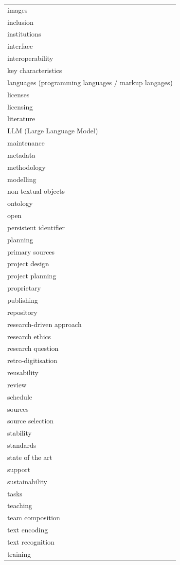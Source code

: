 \documentclass[
  letterpaper,
  DIV=11,
  numbers=noendperiod]{scrreprt}
\begin{document}
\begin{longtable}[]{@{}
  >{\raggedright\arraybackslash}p{}@{}}
images \\
inclusion \\
institutions \\
interface \\
interoperability \\
key characteristics \\
languages (programming languages / markup langages) \\
licenses \\
licensing \\
literature \\
LLM (Large Language Model) \\
maintenance \\
metadata \\
methodology \\
modelling \\
non textual objects \\
ontology \\
open \\
persistent identifier \\
planning \\
primary sources \\
project design \\
project planning \\
proprietary \\
publishing \\
repository \\
research-driven approach \\
research ethics \\
research question \\
retro-digitisation \\
reusability \\
review \\
schedule \\
sources \\
source selection \\
stability \\
standards \\
state of the art \\
support \\
sustainability \\
tasks \\
teaching \\
team composition \\
text encoding \\
text recognition \\
training \\

\end{longtable}
\end{document}
